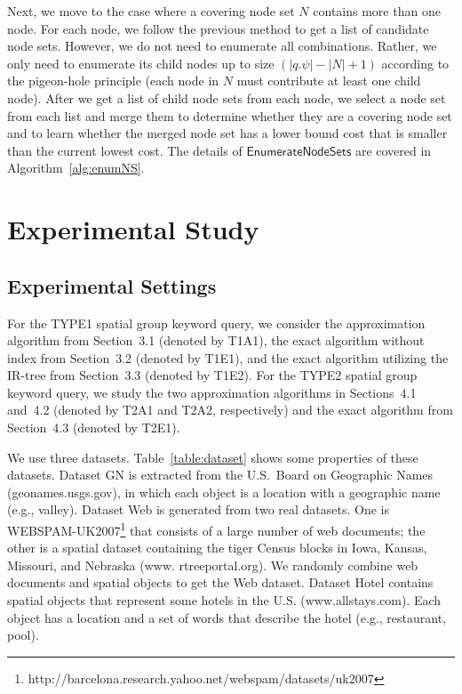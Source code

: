\documentclass{sig-alternate}
\begin{document}
Next, we move to the case where a covering node set $N$ contains more
than one node. For each node, we follow the previous
method to get a list of candidate node sets. However, we do not need
to enumerate all combinations. Rather, we only need to enumerate
its child nodes up to size $(|q.\psi|-|N|+1)$ according to the
pigeon-hole principle (each node in $N$ must contribute at least one
child node).
%
After we get a list of child node sets from each node, we select a
node set from each list and merge them to determine whether they are
a covering node set and to learn whether the merged node set has a
lower bound cost that is smaller than the current lowest cost.
%
The details of $\mathsf{EnumerateNodeSets}$ are covered in
Algorithm~\ref{alg:enumNS}.




\section{Experimental Study}\label{sec:exp}


\subsection{Experimental Settings}\label{sec:setting}

  For the TYPE1 spatial group keyword
query, we consider the approximation algorithm from Section~3.1
(denoted by T1A1), the exact algorithm without index from Section~3.2
(denoted by T1E1), and the exact algorithm utilizing the IR-tree from
Section~3.3 (denoted by T1E2). For the TYPE2 spatial group keyword
query, we study the two approximation algorithms in Sections~4.1 and~4.2 (denoted
by T2A1 and T2A2, respectively) and the exact algorithm from Section~4.3 (denoted by T2E1).

 We use three datasets.
%
Table~\ref{table:dataset} shows some properties of these datasets.
%
Dataset \textsf{GN} is extracted from the U.S.\ Board on Geographic
Names (geonames.usgs.gov), in which each object is a location with a
geographic name (e.g., valley).
%
Dataset \textsf{Web} is generated from two real datasets. One is
WEBSPAM-UK2007\footnote{\small
http://barcelona.research.yahoo.net/webspam/datasets/uk2007} that
consists of a large number of web documents; the other is a spatial
dataset containing the tiger Census blocks in Iowa, Kansas,
Missouri, and Nebraska (www. rtreeportal.org). We randomly combine
web documents and spatial objects to get the \textsf{Web} dataset.
%
Dataset \textsf{Hotel} contains spatial objects that represent some
hotels in the U.S. (www.allstays.com). Each object has a location
and a set of words that describe the hotel (e.g., restaurant, pool).
\end{document}

